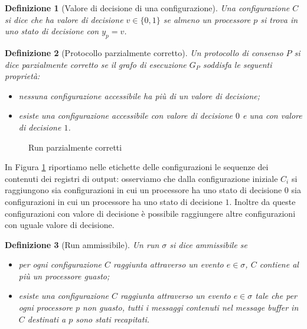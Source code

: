 \documentclass{article}
\newtheorem{definizione}{Definizione}
\begin{document}
\begin{definizione}[Valore di decisione di una configurazione]
  Una configurazione $C$ si dice che \emph{ha valore di decisione} $v
  \in \{0,1\}$ se almeno un processore $p$ si trova in uno stato di
  decisione con $y_p=v$.
\end{definizione}

\begin{definizione}[Protocollo parzialmente corretto]
  Un protocollo di consenso $P$ si dice \emph{parzialmente corretto}
  se il grafo di esecuzione $G_P$ soddisfa le seguenti propriet\`a:
\begin{itemize}
\item nessuna configurazione accessibile ha più di un valore di
  decisione;
\item esiste una configurazione accessibile con valore di decisione
  $0$ e una con valore di decisione $1$.
\end{itemize}  
\end{definizione}

\begin{figure}[!h]
  \centering \caption{Run
    parzialmente corretti}\label{fig:parzialmenteCorretto}
\end{figure}

In Figura \ref{fig:parzialmenteCorretto} riportiamo nelle etichette
delle configurazioni le sequenze dei contenuti dei registri di output:
osserviamo che dalla configurazione iniziale $C_i$ si raggiungono sia
configurazioni in cui un processore ha uno stato di decisione $0$ sia
configurazioni in cui un processore ha uno stato di decisione
$1$. Inoltre da queste configurazioni con valore di decisione \`e
possibile raggiungere altre configurazioni con uguale valore di
decisione.

\begin{definizione}[Run ammissibile]
  Un run $\sigma$ si dice \emph{ammissibile} se 
  \begin{itemize}
  \item per ogni configurazione $C$ raggiunta attraverso un evento
    $e\in \sigma$, $C$ contiene al più un processore guasto;
  \item esiste una configurazione $C$ raggiunta attraverso un evento
    $e\in \sigma$ tale che per ogni processore $p$ non guasto, tutti i
    messaggi contenuti nel message buffer in $C$ destinati a $p$ sono
    stati recapitati.
  \end{itemize}
\end{definizione}
\end{document}

